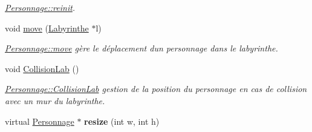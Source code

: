 \begin{DoxyCompactItemize}
\begin{DoxyCompactList}\small\item\em \hyperlink{class_personnage_a99c5442355ae6ebd56f34055a114ba69}{Personnage\+::reinit}. \end{DoxyCompactList}\item 
void \hyperlink{class_personnage_a6ae5430d11fd2f01a4219722d860929f}{move} (\hyperlink{class_labyrinthe}{Labyrinthe} $\ast$l)
\begin{DoxyCompactList}\small\item\em \hyperlink{class_personnage_a6ae5430d11fd2f01a4219722d860929f}{Personnage\+::move} gère le déplacement d\textquotesingle{}un personnage dans le labyrinthe. \end{DoxyCompactList}\item 
\hypertarget{class_personnage_a5791bfb8523c996039f4376c7daf4881}{}void \hyperlink{class_personnage_a5791bfb8523c996039f4376c7daf4881}{Collision\+Lab} ()\label{class_personnage_a5791bfb8523c996039f4376c7daf4881}

\begin{DoxyCompactList}\small\item\em \hyperlink{class_personnage_a5791bfb8523c996039f4376c7daf4881}{Personnage\+::\+Collision\+Lab} gestion de la position du personnage en cas de collision avec un mur du labyrinthe. \end{DoxyCompactList}\item 
\hypertarget{class_personnage_a97bb68a40dc43e1c4a0ac920fb24e4ad}{}virtual \hyperlink{class_personnage}{Personnage} $\ast$ {\bfseries resize} (int w, int h)\label{class_personnage_a97bb68a40dc43e1c4a0ac920fb24e4ad}

\end{DoxyCompactItemize}
